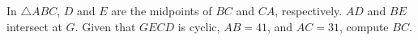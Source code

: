 In $\triangle ABC$, $D$ and $E$ are the midpoints of $BC$ and $CA$, respectively. $AD$ and $BE$ intersect at $G$. Given that $GECD$ is cyclic, $AB = 41$, and $AC = 31$, compute $BC$.

